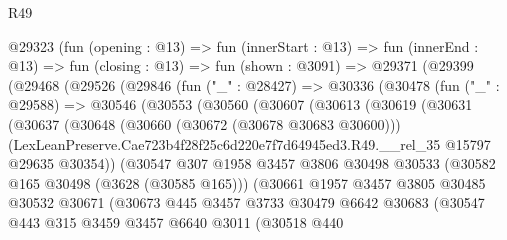 \begin{lexlean}{R49}
\begin{coremodule}
      @29323
        (fun (opening : @13) =>
        fun (innerStart : @13) =>
        fun (innerEnd : @13) =>
        fun (closing : @13) =>
        fun (shown : @3091) =>
        @29371
          (@29399
            (@29468
              (@29526
                (@29846
                  (fun ("_" : @28427) =>
                  @30336
                    (@30478
                      (fun ("_" : @29588) =>
                      @30546
                        (@30553
                          (@30560
                            (@30607
                              (@30613
                                (@30619
                                  (@30631
                                    (@30637
                                      (@30648
                                        (@30660 (@30672 (@30678 @30683 @30600)))
                                        (LexLeanPreserve.Cae723b4f28f25c6d220e7f7d64945ed3.R49.__rel_35
                                          @15797
                                          @29635
                                          @30354))
                                      (@30547
                                        @307
                                        @1958
                                        @3457
                                        @3806
                                        @30498
                                        @30533
                                        (@30582 @165 @30498 (@3628 (@30585 @165)))
                                        (@30661
                                          @1957
                                          @3457
                                          @3805
                                          @30485
                                          @30532
                                          @30671
                                          (@30673
                                            @445
                                            @3457
                                            @3733
                                            @30479
                                            @6642
                                            @30683
                                            (@30547
                                              @443
                                              @315
                                              @3459
                                              @3457
                                              @6640
                                              @3011
                                              (@30518
                                                @440

\end{coremodule}
\end{lexlean}
